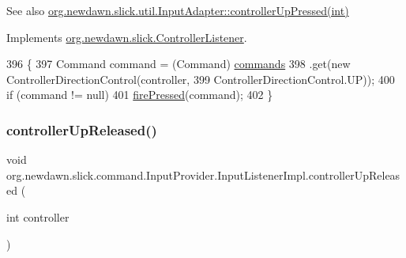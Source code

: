 \begin{DoxySeeAlso}{See also}
\mbox{\hyperlink{classorg_1_1newdawn_1_1slick_1_1util_1_1_input_adapter_ae4728619a49e096201282b048c6b11df}{org.\+newdawn.\+slick.\+util.\+Input\+Adapter\+::controller\+Up\+Pressed(int)}} 
\end{DoxySeeAlso}


Implements \mbox{\hyperlink{interfaceorg_1_1newdawn_1_1slick_1_1_controller_listener_a7cb917761de1e555b23469042b6f1e03}{org.\+newdawn.\+slick.\+Controller\+Listener}}.


\begin{DoxyCode}
396                                                         \{
397             Command command = (Command) \mbox{\hyperlink{classorg_1_1newdawn_1_1slick_1_1command_1_1_input_provider_ab2bd0c08506a59bc7457d7a87cf873d2}{commands}}
398                     .\textcolor{keyword}{get}(\textcolor{keyword}{new} ControllerDirectionControl(controller,
399                             ControllerDirectionControl.UP));
400             \textcolor{keywordflow}{if} (command != null)
401                 \mbox{\hyperlink{classorg_1_1newdawn_1_1slick_1_1command_1_1_input_provider_a82cd36086b5780ccce446717e8075e96}{firePressed}}(command);
402         \}
\end{DoxyCode}
\mbox{\label{classorg_1_1newdawn_1_1slick_1_1command_1_1_input_provider_1_1_input_listener_impl_a44338713bf5dfac2e16ced2d29c921bc}} 
\subsubsection{\texorpdfstring{controller\+Up\+Released()}{controllerUpReleased()}}
{\footnotesize\ttfamily void org.\+newdawn.\+slick.\+command.\+Input\+Provider.\+Input\+Listener\+Impl.\+controller\+Up\+Released (\begin{DoxyParamCaption}\item[{int}]{controller }\end{DoxyParamCaption})\hspace{0.3cm}{\ttfamily [inline]}}


